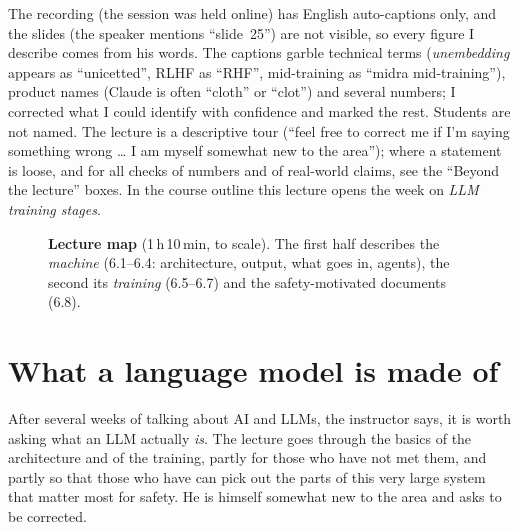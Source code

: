 \begin{caution}
The recording (the session was held online) has English auto-captions only, and the slides (the speaker mentions ``slide~25'') are not visible, so every figure I describe comes from his words. The captions garble technical terms (\emph{unembedding} appears as ``unicetted'', RLHF as ``RHF'', mid-training as ``midra mid-training''), product names (Claude is often ``cloth'' or ``clot'') and several numbers; I corrected what I could identify with confidence and marked the rest\flag. Students are not named. The lecture is a descriptive tour (``feel free to correct me if I'm saying something wrong \ldots{} I am myself somewhat new to the area''); where a statement is loose, and for all checks of numbers and of real-world claims, see the ``Beyond the lecture'' boxes. In the course outline this lecture opens the week on \emph{LLM training stages}.
\end{caution}

\begin{figure}[tb]
\centering
{}
\caption{\textbf{Lecture map} (1\,h\,10\,min, to scale). The first half describes the \emph{machine} (6.1--6.4: architecture, output, what goes in, agents), the second its \emph{training} (6.5--6.7) and the safety-motivated documents (6.8).}
\end{figure}

\section{What a language model is made of}\label{sec:L6-arch}
After several weeks of talking about AI and LLMs, the instructor says, it is worth asking what an LLM actually \emph{is}. The lecture goes through the basics of the architecture and of the training, partly for those who have not met them, and partly so that those who have can pick out the parts of this very large system that matter most for safety. He is himself somewhat new to the area and asks to be corrected.

